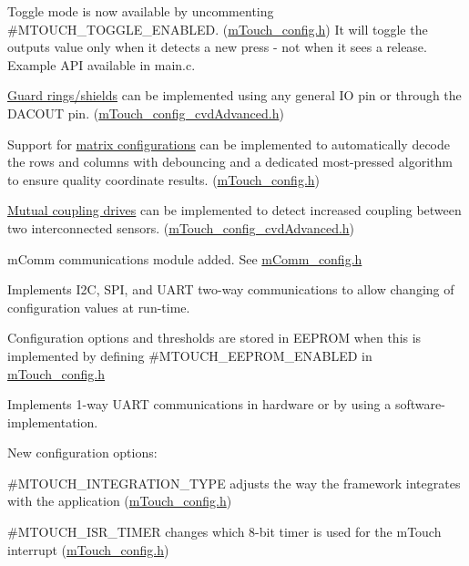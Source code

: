 \begin{DoxyItemize}
\begin{DoxyItemize}
\item Toggle mode is now available by uncommenting \#\+M\+T\+O\+U\+C\+H\+\_\+\+T\+O\+G\+G\+L\+E\+\_\+\+E\+N\+A\+B\+L\+E\+D. (\hyperlink{m_touch__config_8h}{m\+Touch\+\_\+config.\+h}) It will toggle the output\textquotesingle{}s value only when it detects a new press -\/ not when it sees a release. Example A\+P\+I available in main.\+c. 
\item \hyperlink{featGuard}{Guard rings/shields} can be implemented using any general I\+O pin or through the D\+A\+C\+O\+U\+T pin. (\hyperlink{m_touch__config__cvd_advanced_8h}{m\+Touch\+\_\+config\+\_\+cvd\+Advanced.\+h}) 
\item Support for \hyperlink{featMatrix}{matrix configurations} can be implemented to automatically decode the rows and columns with debouncing and a dedicated most-\/pressed algorithm to ensure quality coordinate results. (\hyperlink{m_touch__config_8h}{m\+Touch\+\_\+config.\+h}) 
\item \hyperlink{featMutual}{Mutual coupling drives} can be implemented to detect increased coupling between two interconnected sensors. (\hyperlink{m_touch__config__cvd_advanced_8h}{m\+Touch\+\_\+config\+\_\+cvd\+Advanced.\+h}) 
\item m\+Comm communications module added. See \hyperlink{m_comm__config_8h}{m\+Comm\+\_\+config.\+h} 
\begin{DoxyItemize}
\item Implements I2\+C, S\+P\+I, and U\+A\+R\+T two-\/way communications to allow changing of configuration values at run-\/time. 
\item Configuration options and thresholds are stored in E\+E\+P\+R\+O\+M when this is implemented by defining \#\+M\+T\+O\+U\+C\+H\+\_\+\+E\+E\+P\+R\+O\+M\+\_\+\+E\+N\+A\+B\+L\+E\+D in \hyperlink{m_touch__config_8h}{m\+Touch\+\_\+config.\+h} 
\item Implements 1-\/way U\+A\+R\+T communications in hardware or by using a software-\/implementation. 
\end{DoxyItemize}
\end{DoxyItemize}\item New configuration options\+: 
\begin{DoxyItemize}
\item \#\+M\+T\+O\+U\+C\+H\+\_\+\+I\+N\+T\+E\+G\+R\+A\+T\+I\+O\+N\+\_\+\+T\+Y\+P\+E adjusts the way the framework integrates with the application (\hyperlink{m_touch__config_8h}{m\+Touch\+\_\+config.\+h}) 
\item \#\+M\+T\+O\+U\+C\+H\+\_\+\+I\+S\+R\+\_\+\+T\+I\+M\+E\+R changes which 8-\/bit timer is used for the m\+Touch interrupt (\hyperlink{m_touch__config_8h}{m\+Touch\+\_\+config.\+h}) 

\end{DoxyItemize}
\end{DoxyItemize}
